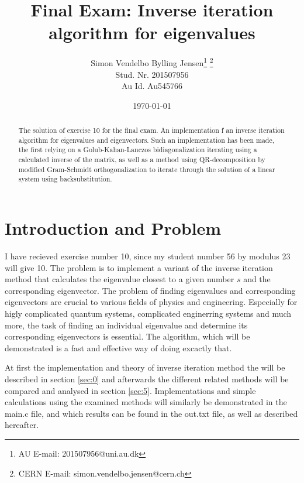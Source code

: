 \documentclass[twocolumn]{article}
\begin{document}
\title{Final Exam: Inverse iteration algorithm for eigenvalues}
\author{Simon Vendelbo Bylling Jensen\thanks{AU E-mail: 201507956@uni.au.dk} \thanks{CERN E-mail: simon.vendelbo.jensen@cern.ch}\\
Stud. Nr. 201507956 \\
Au Id. Au545766}
\date{\today}
\maketitle

\begin{abstract}
The  solution of exercise 10 for the final exam. An implementation f an inverse iteration algorithm for eigenvalues and eigenvectors. Such an implementation has been made, the first relying on a Golub-Kahan-Lanczos bidiagonalization iterating using a calculated inverse of the matrix, as well as a method using QR-decomposition by modified Gram-Schmidt orthogonalization to iterate through the solution of a linear system using backsubstitution. 
\end{abstract}

\section*{Introduction and Problem}
I have recieved exercise number 10, since my student number 56 by modulus 23 will give 10. The problem is to implement a variant of the inverse iteration method that calculates the eigenvalue closest to a given number $s$ and the corresponding eigenvector. The problem of finding eigenvalues and corresponding eigenvectors are crucial to various fields of physics and engineering. Especially for higly complicated quantum systems, complicated enginerring systems and much more, the task of finding an individual eigenvalue and determine its corresponding eigenvectors is essential. The algorithm, which will be demonstrated is a fast and effective way of doing excactly that. 

At first the implementation and theory of inverse iteration method the will be described in section \ref{sec:0} and afterwards the different related methods will be compared and analysed in section \ref{sec:5}. Implementations and simple calculations using the examined methods will similarly be demonstrated in the main.c file, and which results can be found in the out.txt file, as well as described hereafter. 
\end{document}
